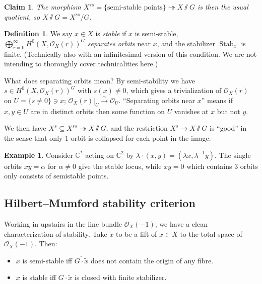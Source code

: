 \documentclass{article}
\newtheorem*{claim}{Claim}
\theoremstyle{definition}
\newtheorem*{definition}{Definition}
\newtheorem*{example}{Example}
\DeclareMathOperator{\Stab}{Stab}
\newcommand{\closure}[1]{\overline{#1}}
\renewcommand{\O}{\mathcal{O}}
\newcommand{\C}{\mathbb{C}}
\begin{document}
\begin{claim}
The morphism $X^{ss}=\{\text{semi-stable points}\}\twoheadrightarrow X\sslash G$
is then the usual quotient, so $X\sslash G=X^{ss}/G$.
\end{claim}

\begin{definition}
    We say $x\in X$ is \emph{stable} if $x$ is semi-stable,
    $\bigoplus_{r=0}^\infty H^0(X,\O_X(r))^G$ \emph{separates orbits} near $x$,
    and the stabilizer $\Stab_x$ is finite. (Technically also with an
    infinitesimal version of this condition. We are not intending to thoroughly
    cover technicalities here.)
\end{definition}

What does separating orbits mean? By semi-stability we have
$s\in H^0(X,\O_X(r))^G$ with $s(x)\ne0$, which gives a trivialization of
$\O_X(r)$ on $U=\{s\ne0\}\ni x$; $\O_X(r)|_U\xrightarrow\sim \O_U$. ``Separating
orbits near $x$'' means if $x,y\in U$ are in distinct orbits then some function
on $U$ vanishes at $x$ but not $y$.

We then have $X^s\subseteq X^{ss}\twoheadrightarrow X\sslash G$, and the
restriction $X^s\to X\sslash G$ is ``good'' in the sense that only 1 orbit is
collapsed for each point in the image.

\begin{example}
    Consider $\C^*$ acting on $\C^2$ by
    $\lambda\cdot(x,y)=(\lambda x,\lambda^{-1}y)$. The single orbits $xy=\alpha$
    for $\alpha\ne0$ give the stable locus, while $xy=0$ which contains 3 orbits
    only consists of semistable points.
\end{example}

\subsection*{Hilbert--Mumford stability criterion}

Working in upstairs in the line bundle $\O_X(-1)$, we have a clean
characterization of stability. Take $\tilde x$ to be a lift of $x\in X$ to the
total space of $\O_X(-1)$. Then:
\begin{itemize}
    \item $x$ is semi-stable iff $\closure{G\cdot\tilde x}$ does not contain the
        origin of any fibre.
    \item $x$ is stable iff $G\cdot\tilde x$ is closed with finite stabilizer.
\end{itemize}
\end{document}
